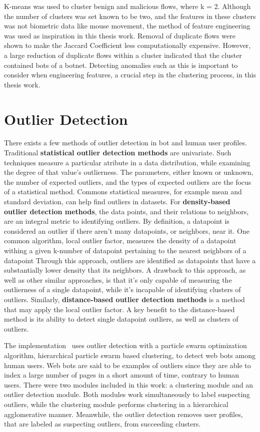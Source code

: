 K-means was used to cluster benign and malicious flows, where k = 2.
Although the number of clusters was set known to be two, and the features in these clusters was not biometric data like mouse movement, the method of feature engineering was used as inspiration in this thesis work.
Removal of duplicate flows were shown to make the Jaccard Coefficient less computationally expensive.
However, a large reduction of duplicate flows within a cluster indicated that the cluster contained bots of a botnet.
Detecting anomalies such as this is important to consider when engineering features, a crucial step in the clustering process, in this thesis work.

\section{Outlier Detection}\label{sec:outlier-detection}
There exists a few methods of outlier detection in bot and human user profiles.
Traditional \textbf{statistical outlier detection methods} are univariate.
Such techniques measure a particular atribute in a data distribution, while examining the degree of that value's outlierness.
The parameters, either known or unknown, the number of expected outliers, and the types of expected outliers are the focus of a statistical method.
Commons statistical measures, for example mean and standard deviation, can help find outliers in datasets.
For \textbf{density-based outlier detection methods}, the data points, and their relations to neighbors, are an integral metric to identifying outliers.
By definition, a datapoint is considered an outlier if there aren't many datapoints, or neighbors, near it.
One common algorithm, local outlier factor, measures the density of a datapoint withing a given k-number of datapoint pertaining to the nearest neighbors of a datapoint
Through this approach, outliers are identified as datapoints that have a substantially lower density that its neighbors.
A drawback to this approach, as well as other similar approaches, is that it's only capable of measuring the outlierness of a single datapoint, while it's incapable of identifying clusters of outliers.
Similarly, \textbf{distance-based outlier detection methods} is a method that may apply the local outlier factor.
A key benefit to the distance-based method is its ability to detect single datapoint outliers, as well as clusters of outliers.

The implementation~\cite{particle_swarm} uses outlier detection with a particle swarm optimization algorithm, hierarchical particle swarm based clustering, to detect web bots among human users.
Web bots are said to be examples of outliers since they are able to index a large number of pages in a short amount of time, contrary to human users.
There were two modules included in this work: a clustering module and an outlier detection module.
Both modules work simultaneously to label suspecting outliers, while the clustering module performs clustering in a hierarchical agglomerative manner.
Meanwhile, the outlier detection removes user profiles, that are labeled as suspecting outliers, from succeeding clusters.

